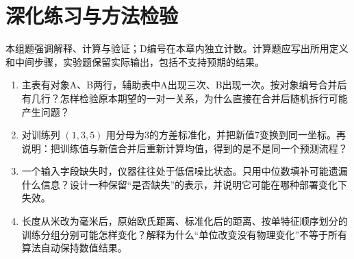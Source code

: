 \section*{深化练习与方法检验}
本组题强调解释、计算与验证；D编号在本章内独立计数。计算题应写出所用定义和中间步骤，实验题保留实际输出，包括不支持预期的结果。
\begin{enumerate}[label=D\arabic*.]
\item 主表有对象A、B两行，辅助表中A出现三次、B出现一次。按对象编号合并后有几行？怎样检验原本期望的一对一关系，为什么直接在合并后随机拆行可能产生问题？
\item 对训练列 $(1,3,5)$ 用分母为3的方差标准化，并把新值7变换到同一坐标。再说明：把训练值与新值合并后重新计算均值，得到的是不是同一个预测流程？
\item 一个输入字段缺失时，仪器往往处于低信噪比状态。只用中位数填补可能遗漏什么信息？设计一种保留“是否缺失”的表示，并说明它可能在哪种部署变化下失效。
\item 长度从米改为毫米后，原始欧氏距离、标准化后的距离、按单特征顺序划分的训练分组分别可能怎样变化？解释为什么“单位改变没有物理变化”不等于所有算法自动保持数值结果。
\end{enumerate}
